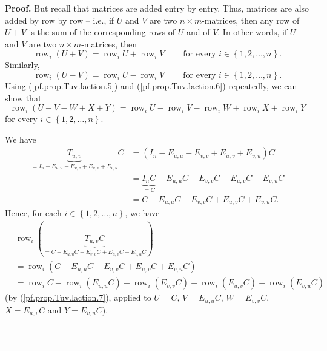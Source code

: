 \documentclass[numbers=enddot,12pt,final,onecolumn,notitlepage]{scrartcl}%
\theoremstyle{definition}
\newenvironment{proof}[1][Proof]{\noindent\textbf{#1.} }{\ \rule{0.5em}{0.5em}}
\begin{document}
\begin{proof}
But recall that matrices are added entry by entry. Thus, matrices are also
added by row by row -- i.e., if $U$ and $V$ are two $n\times m$-matrices, then
any row of $U+V$ is the sum of the corresponding rows of $U$ and of $V$. In
other words, if $U$ and $V$ are two $n\times m$-matrices, then%
\begin{equation}
\operatorname*{row}\nolimits_{i}\left(  U+V\right)  =\operatorname*{row}%
\nolimits_{i}U+\operatorname*{row}\nolimits_{i}V\ \ \ \ \ \ \ \ \ \ \text{for
every }i\in\left\{  1,2,\ldots,n\right\}  . \label{pf.prop.Tuv.laction.5}%
\end{equation}
Similarly,%
\begin{equation}
\operatorname*{row}\nolimits_{i}\left(  U-V\right)  =\operatorname*{row}%
\nolimits_{i}U-\operatorname*{row}\nolimits_{i}V\ \ \ \ \ \ \ \ \ \ \text{for
every }i\in\left\{  1,2,\ldots,n\right\}  . \label{pf.prop.Tuv.laction.6}%
\end{equation}
Using (\ref{pf.prop.Tuv.laction.5}) and (\ref{pf.prop.Tuv.laction.6})
repeatedly, we can show that%
\begin{equation}
\operatorname*{row}\nolimits_{i}\left(  U-V-W+X+Y\right)  =\operatorname*{row}%
\nolimits_{i}U-\operatorname*{row}\nolimits_{i}V-\operatorname*{row}%
\nolimits_{i}W+\operatorname*{row}\nolimits_{i}X+\operatorname*{row}%
\nolimits_{i}Y \label{pf.prop.Tuv.laction.7}%
\end{equation}
for every $i\in\left\{  1,2,\ldots,n\right\}  $.

We have%
\begin{align*}
\underbrace{T_{u,v}}_{=I_{n}-E_{u,u}-E_{v,v}+E_{u,v}+E_{v,u}}C  &  =\left(
I_{n}-E_{u,u}-E_{v,v}+E_{u,v}+E_{v,u}\right)  C\\
&  =\underbrace{I_{n}C}_{=C}-E_{u,u}C-E_{v,v}C+E_{u,v}C+E_{v,u}C\\
&  =C-E_{u,u}C-E_{v,v}C+E_{u,v}C+E_{v,u}C.
\end{align*}
Hence, for each $i\in\left\{  1,2,\ldots,n\right\}  $, we have%
\begin{align}
&  \operatorname*{row}\nolimits_{i}\left(  \underbrace{T_{u,v}C}%
_{=C-E_{u,u}C-E_{v,v}C+E_{u,v}C+E_{v,u}C}\right) \nonumber\\
&  =\operatorname*{row}\nolimits_{i}\left(  C-E_{u,u}C-E_{v,v}C+E_{u,v}%
C+E_{v,u}C\right) \nonumber\\
&  =\operatorname*{row}\nolimits_{i}C-\operatorname*{row}\nolimits_{i}\left(
E_{u,u}C\right)  -\operatorname*{row}\nolimits_{i}\left(  E_{v,v}C\right)
+\operatorname*{row}\nolimits_{i}\left(  E_{u,v}C\right)  +\operatorname*{row}%
\nolimits_{i}\left(  E_{v,u}C\right)  \label{pf.prop.Tuv.laction.9}%
\end{align}
(by (\ref{pf.prop.Tuv.laction.7}), applied to $U=C$, $V=E_{u,u}C$,
$W=E_{v,v}C$, $X=E_{u,v}C$ and $Y=E_{v,u}C$).


\end{proof}
\end{document}
